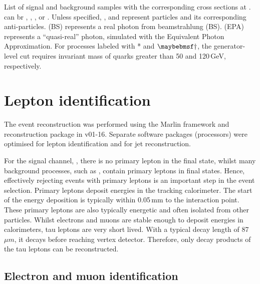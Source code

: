 \begin{table}[!tbp]
\caption[Signal and background samples with the corresponding cross sections at .]{List of signal and background samples with the corresponding cross sections at . \Pquark can br \Pup, \Pdown, \Pstrange, \Pbottom or \Ptop. Unless specified, \Pquark, \Plepton and \Pnu represent particles and its corresponding anti-particles. \Pphoton(BS) represents a real photon from beamstrahlung (BS). \Pphoton(EPA) represents a ``quasi-real'' photon, simulated with the Equivalent Photon Approximation. For processes labeled with * and $\myDagger$, the generator-level cut requires invariant mass of quarks greater than 50 and 120\,GeV, respectively.}
\label{tab:doubleHiggsMCSamples}
\end{table}

\section{Lepton identification}
\label{sec:doubleHiggsLepton}

The event reconstruction was performed using the Marlin framework and reconstruction package in \ilcsoft v01-16. Separate software packages (processors) were optimised for lepton identification and for jet reconstruction. %


For the signal channel, \eeToHHbbWWHad, there is no primary lepton in the final state, whilst many background  processes, such as \HepProcess{\Pquark \Pquark \Pquark \Pquark \Plepton \Pnu}, contain primary leptons in final states. Hence, effectively rejecting events with primary leptons is an important step in the event selection. Primary leptons deposit energies in the tracking calorimeter. The start of the energy deposition is typically within 0.05\,mm to the interaction point. These primary leptons are also typically energetic and often isolated from other particles. Whilst electrons and muons are stable enough to deposit energies in calorimeters, tau leptons are very short lived. With a typical decay length of 87\,$\mu{m}$, it decays before reaching vertex detector. Therefore, only decay products of the tau leptons can be reconstructed.

\subsection{Electron and muon identification}
\label{sec:doubleHiggsLeptonID}

